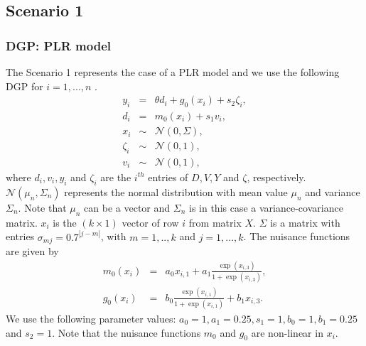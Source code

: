 \documentclass[10pt]{article}
\begin{document}
\subsection{Scenario 1}
\subsubsection{DGP: PLR model}
The Scenario 1 represents the case of a PLR model and we use the following DGP for $i=1,...,n$ \cite{Cher2018}.
\begin{eqnarray*}\label{dgp_1.1}
y_i &=& \theta d_i + g_0(x_i) + s_2 \zeta_i, \\
d_i &=& m_0(x_i) + s_1 v_i, \\
x_i &\sim& \mathcal{N}(0, \Sigma),\\
\zeta_i &\sim& \mathcal{N}(0,1),\\
v_i &\sim& \mathcal{N}(0,1),
\end{eqnarray*}
where $d_i, v_i, y_i$ and $\zeta_i$ are the $i^{th}$ entries of $D,V,Y$ and $\zeta$, respectively.
$ \mathcal{N}(\mu_n, \Sigma_n)$ represents the normal distribution with mean value $\mu_n$ and variance $\Sigma_n$.
Note that  $\mu_n$ can be a vector and $\Sigma_n$ is in this case a variance-covariance matrix.
$x_i$ is the $(k \times 1)$ vector of row $i$ from matrix $X$.
$\Sigma$ is a matrix with entries $\sigma_{mj} = 0.7^{|j-m|}$, with $m=1,..,k$ and $j=1,...,k$.
The nuisance functions are given by
\begin{eqnarray*}\label{dgp_1.2}
m_0(x_i) &=& a_0 x_{i,1} + a_1 \frac{\exp(x_{i,3})}{1+\exp(x_{i,3})},\\
g_0(x_i) &=& b_0 \frac{\exp(x_{i,1})}{1+\exp(x_{i,1})} + b_1 x_{i,3}.
\end{eqnarray*}
We use the following parameter values: $a_0=1, a_1=0.25, s_1=1, b_0=1, b_1=0.25$ and $s_2=1$.
Note that the nuisance functions $m_0$ and $g_0$ are non-linear in $x_i$.
\end{document}

